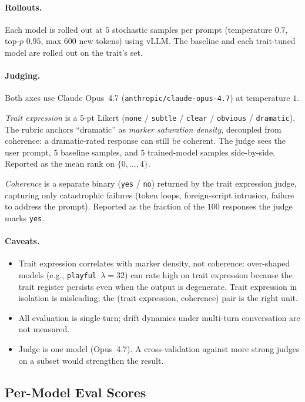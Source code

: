 \documentclass{article} %
\begin{document}
\paragraph{Rollouts.}
Each model is rolled out at $5$ stochastic samples per prompt
(temperature $0.7$, top-$p$ $0.95$, max $600$ new tokens) using vLLM.
The baseline and each trait-tuned model are rolled out on the
trait's set.

\paragraph{Judging.}
Both axes use Claude Opus~4.7
(\texttt{anthropic/claude-opus-4.7}) at temperature $1$.

\emph{Trait expression} is a 5-pt Likert (\texttt{none} / \texttt{subtle} /
\texttt{clear} / \texttt{obvious} / \texttt{dramatic}). The rubric
anchors ``dramatic'' as \emph{marker saturation density}, decoupled
from coherence: a dramatic-rated response can still be coherent. The
judge sees the user prompt, $5$ baseline samples, and $5$
trained-model samples side-by-side. Reported as the mean rank on
$\{0,\dots,4\}$.

\emph{Coherence} is a separate binary (\texttt{yes} / \texttt{no})
returned by the trait expression judge, capturing only catastrophic
failures (token loops, foreign-script intrusion, failure to address
the prompt). Reported as the fraction of the $100$
responses the judge marks \texttt{yes}.

\paragraph{Caveats.}
\begin{itemize}
\item Trait expression correlates with marker density, not coherence:
over-shaped models (e.g., \texttt{playful $\lambda{=}32$}) can rate
high on trait expression because the trait register persists even when the
output is degenerate. Trait expression in isolation is misleading; the
(trait expression, coherence) pair is the right unit.
\item All evaluation is single-turn; drift dynamics under multi-turn
conversation are not measured.
\item Judge is one model (Opus~4.7). A cross-validation against more
strong judges on a subset would strengthen the result.
\end{itemize}

\subsection{Per-Model Eval Scores}
\label{app:eval-scores-headline}
\end{document}
